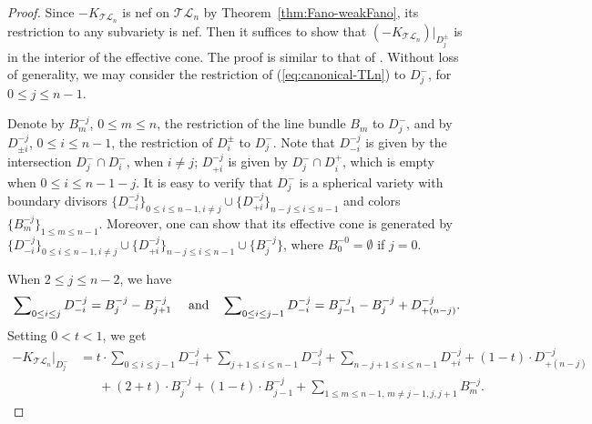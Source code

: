 \documentclass[10pt]{amsart}
\theoremstyle{definition}
\newcommand{\TL}{\mathcal{TL}}
\theoremstyle{plain} %
\begin{document}
\begin{proof}
Since $-K_{\TL_n}$ is nef on $\TL_n$ by Theorem~\ref{thm:Fano-weakFano}, its restriction to any subvariety is nef. %
Then it suffices to show that $(-K_{\mathcal {TL}_{n}})|_{D^{\pm}_j}$ is in the interior of the effective cone. 
The proof is similar to that of \cite[Theorem 1.2]{FZ21}. Without loss of generality, we may consider the restriction of (\ref{eq:canonical-TLn}) to $D^-_j$, for $0\le j\le n-1$.  

Denote by $B^{-j}_{m}$, $0\leq m\leq n$, the restriction of the line bundle $B_m$ to $D^{-}_j$, and by $D^{-j}_{\pm i}$, $0\leq i\leq n-1$, the restriction of $D^{\pm}_i$ to $D^-_j$. Note that $D^{-j}_{-i}$ is given by the intersection $D^{-}_j\cap D^{-}_i$, when $i\neq j$; $D^{-j}_{+i}$ is given by $D^{-}_j\cap D^{+}_i$, which is empty when $0\leq i\leq n-1-j$. %
It is easy to verify that $D^{-}_j$ is a spherical variety with boundary divisors $\{D^{-j}_{-i}\}_{0\leq i\leq n-1, i\neq j}\cup\{D^{-j}_{+i}\}_{n-j\leq i\leq n-1}$ and colors $\{B^{-j}_m\}_{1\leq m\leq n-1}$. Moreover, one can show that its effective cone is generated by $\{D^{-j}_{-i}\}_{0\leq i\leq n-1, i\neq j}\cup\{D^{-j}_{+i}\}_{n-j\leq i\leq n-1}\cup\{B^{-j}_{j}\}$, where $B^{-0}_0 = \emptyset$ if $j = 0$.  %

When $2\leq j\leq n-2$, we have 
\begin{equation*}
\sum\nolimits_{0\leq i\leq j}D^{-j}_{-i}=B^{-j}_{j}-B^{-j}_{j+1}\,\,\,\,\,\,\,\,{\rm and}\,\,\,\,\,\,\sum\nolimits_{0\leq i\leq j-1}D^{-j}_{-i}=B^{-j}_{j-1}-B^{-j}_{j}+D^{-j}_{+(n-j)}.
\end{equation*}
Setting $0<t<1$, we get
\begin{equation*}
\begin{split}
-K_{\mathcal {TL}_{n}}|_{D^{-}_j}&= t\cdot\sum\nolimits_{0\leq i\leq j-1}D^{-j}_{-i}+
\sum\nolimits_{j+1\leq i\leq n-1} D^{-j}_{-i}+\sum\nolimits_{n-j+1\leq i\leq n-1}D^{-j}_{+i}+(1-t)\cdot D^{-j}_{+(n-j)}\\
&\,\,\,\,\,\,\,\,\,+(2+t)\cdot B_{j}^{-j}+(1-t)\cdot B_{j-1}^{-j}+\sum\nolimits_{1\leq m\leq n-1,\,m\neq j-1,j,j+1}B_{m}^{-j}.
\end{split} 
\end{equation*}


\end{proof}
\end{document}
